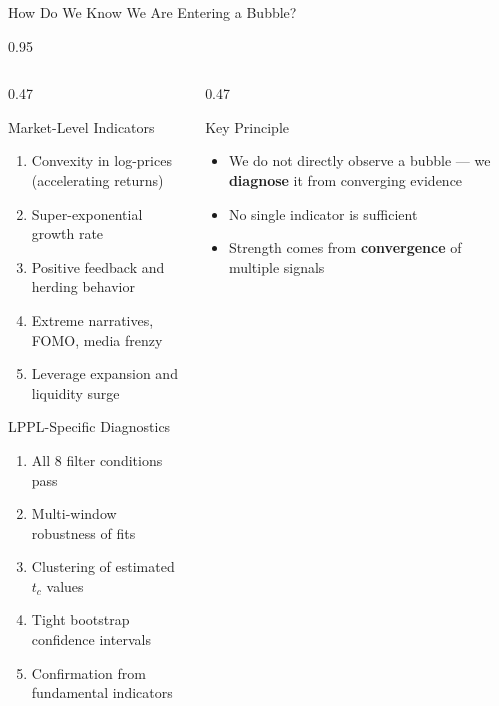 \documentclass[9pt, aspectratio=169, t]{beamer}
\begin{document}
\begin{frame}{How Do We Know We Are Entering a Bubble?}
    \begin{cminipage}{0.95\textwidth}
    {\footnotesize
    \begin{columns}[T]
        \begin{column}{0.47\textwidth}
            \begin{block}{Market-Level Indicators}
                \begin{enumerate}\setlength{\itemsep}{0pt}
                    \item Convexity in log-prices (accelerating returns)
                    \item Super-exponential growth rate
                    \item Positive feedback and herding behavior
                    \item Extreme narratives, FOMO, media frenzy
                    \item Leverage expansion and liquidity surge
                \end{enumerate}
            \end{block}

            \begin{exampleblock}{LPPL-Specific Diagnostics}
                \begin{enumerate}\setlength{\itemsep}{0pt}
                    \setcounter{enumi}{5}
                    \item All 8 filter conditions pass
                    \item Multi-window robustness of fits
                    \item Clustering of estimated $t_c$ values
                    \item Tight bootstrap confidence intervals
                    \item Confirmation from fundamental indicators
                \end{enumerate}
            \end{exampleblock}
        \end{column}
        \begin{column}{0.47\textwidth}
            \begin{alertblock}{Key Principle}
                \begin{itemize}\setlength{\itemsep}{0pt}
                    \item We do not directly observe a bubble --- we \textbf{diagnose} it from converging evidence
                    \item No single indicator is sufficient
                    \item Strength comes from \textbf{convergence} of multiple signals
                \end{itemize}
            \end{alertblock}


\end{column}
\end{columns}}
\end{cminipage}
\end{frame}
\end{document}
